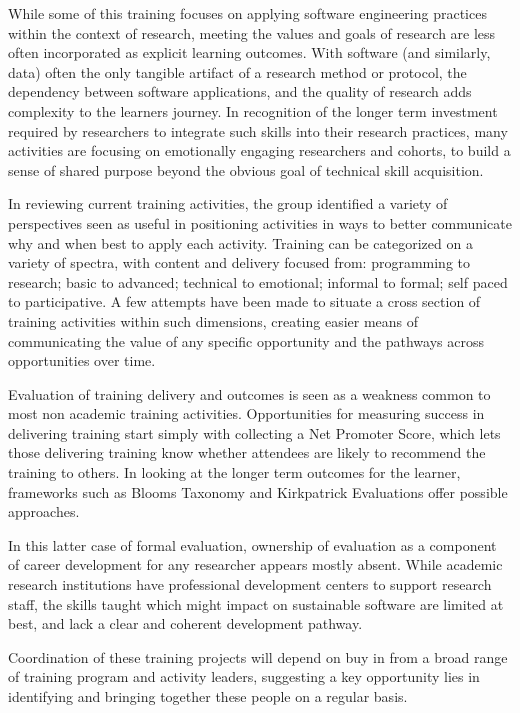 While some of this training focuses on applying software engineering practices within the context of research, meeting the values and goals of research are less often incorporated as explicit learning outcomes. With software (and similarly, data) often the only tangible artifact of a research method or protocol, the dependency between software applications, and the quality of research adds complexity to the learners journey. In recognition of the longer term investment required by researchers to integrate such skills into their research practices, many activities are focusing on emotionally engaging researchers and cohorts, to build a sense of shared purpose beyond the obvious goal of technical skill acquisition.

In reviewing current training activities, the group identified a variety of perspectives seen as useful in positioning activities in ways to better communicate why and when best to apply each activity. Training can be categorized on a variety of spectra, with content and delivery focused from: programming to research; basic to advanced; technical to emotional; informal to formal; self paced to participative. A few attempts have been made to situate a cross section of training activities within such dimensions, creating easier means of communicating the value of any specific opportunity and the pathways across opportunities over time.

Evaluation of training delivery and outcomes is seen as a weakness common to most non academic training activities. Opportunities for measuring success in delivering training start simply with collecting a Net Promoter Score, which lets those delivering training know whether attendees are likely to recommend the training to others. In looking at the longer term outcomes for the learner, frameworks such as Blooms Taxonomy and Kirkpatrick Evaluations offer possible approaches.

In this latter case of formal evaluation, ownership of evaluation as a component of career development for any researcher appears mostly absent. While academic research institutions have professional development centers to support research staff, the skills taught which might impact on sustainable software are limited at best, and lack a clear and coherent development pathway.

Coordination of these training projects will depend on buy in from a broad range of training program and activity leaders, suggesting a key opportunity lies in identifying and bringing together these people on a regular basis.

